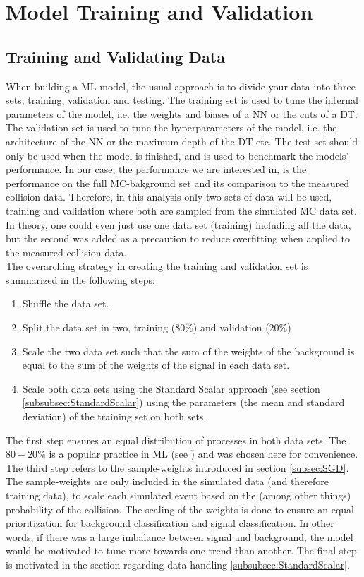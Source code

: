 \newpage
\section{Model Training and Validation}
\subsection{Training and Validating Data}\label{subsec:TraVal}
When building a \ac{ML}-model, the usual approach is to divide your data into three sets; training, validation and 
testing. The training set is used to tune the internal parameters of the model, i.e. the weights and biases of a \ac{NN} or the cuts of a \ac{DT}.
The validation set is used to tune the hyperparameters of the model, i.e. the architecture of the \ac{NN} or the maximum depth of the \ac{DT} etc.
The test set should only be used when the model is finished, and is used to benchmark the models' performance. In our case, the performance we are 
interested in, is the performance on the full \ac{MC}-bakground set and its comparison to the measured collision data. 
Therefore, in this analysis only two sets of data will be used, training and validation where both are sampled from the simulated
\ac{MC} data set. In theory, one could even just use one data set (training) including all the data, but the second was added as a precaution to reduce 
overfitting when applied to the measured collision data.
\\
The overarching strategy in creating the training and validation set is summarized in the following steps:
\begin{enumerate}
    \item Shuffle the data set. 
    \item Split the data set in two, training ($80\%$) and validation ($20\%$)
    \item Scale the two data set such that the sum of the weights of the background is equal to the sum of the weights of the signal in each data set.
    \item Scale both data sets using the Standard Scalar approach (see section \ref{subsubsec:StandardScalar}) using the parameters (the mean and standard deviation) 
    of the training set on both sets.
\end{enumerate}
The first step ensures an equal distribution of processes in both data sets. The $80-20\%$ is a popular practice in \ac{ML} (see \cite{8020}) and was chosen 
here for convenience. The third step refers to the sample-weights introduced in section \ref{subsec:SGD}. The sample-weights are only included in the simulated data
(and therefore training data), to scale each simulated event based on the (among other things) probability of the collision. The scaling of the weights is done to 
ensure an equal prioritization for background classification and signal classification. In other words, if there was a large imbalance between signal and background, 
the model would be motivated to tune more towards one trend than another. The final step is motivated in the section regarding data handling \ref{subsubsec:StandardScalar}. 


